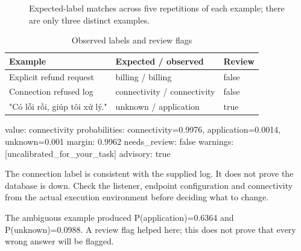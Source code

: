 \documentclass[10pt,a4paper]{article}
\begin{document}
\begin{figure}[H]
\centering
{}
\caption{Expected-label matches across five repetitions of each example; there are only three distinct examples.}
\end{figure}
\begin{table}[H]
\centering\small
\renewcommand{\arraystretch}{1.15}
\begin{tabularx}{\linewidth}{@{}YYY@{}}
\toprule
\textbf{Example} & \textbf{Expected / observed} & \textbf{Review} \\
\midrule
Explicit refund request & billing / billing & false \\
Connection refused log & connectivity / connectivity & false \\
"Có lỗi rồi, giúp tôi xử lý." & unknown / application & true \\
\bottomrule
\end{tabularx}
\caption{Observed labels and review flags}
\end{table}
\begin{Code}
value: connectivity
probabilities: connectivity=0.9976, application=0.0014, unknown=0.001
margin: 0.9962
needs_review: false
warnings: [uncalibrated_for_your_task]
advisory: true
\end{Code}
The connection label is consistent with the supplied log. It does not prove the database is down. Check the listener, endpoint configuration and connectivity from the actual execution environment before deciding what to change.

The ambiguous example produced P(application)=0.6364 and P(unknown)=0.0988. A review flag helped here; this does not prove that every wrong answer will be flagged.
\end{document}
